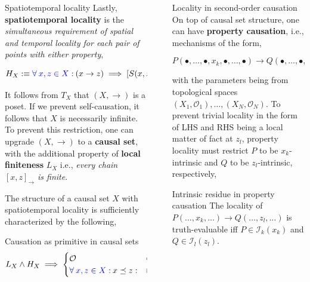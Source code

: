 \documentclass[final]{beamer}
\newenvironment{highlight}
{\begin{tcolorbox}[colback=lightblue, boxrule=0pt, frame empty]}
{\end{tcolorbox}}
\newlength{\sepwidth}
\newlength{\colwidth}
\newcommand{\separatorcolumn}{\begin{column}{\sepwidth}\end{column}}
\newcommand{\fa}{\forall \:}
\newcommand{\mc}{\mathcal}
\theoremstyle{remark}
\begin{document}
\begin{frame}[t]
\begin{columns}[t]
\begin{column}{\colwidth}
\begin{block}{Spatiotemporal locality}
Lastly, \textbf{spatiotemporal locality} is the \emph{simultaneous requirement of spatial and temporal locality for each pair of points with either property},

\begin{highlight}
$$H_X : \equiv \qua{\fa x, z \in X :} (x \to z) \implies \s{S(x, z) \iff T(x, z)}$$
\end{highlight}

It follows from $T_X$ that $(X, \to)$ is a poset. If we prevent self-causation, it follows that $X$ is necessarily infinite. To prevent this restriction, one can upgrade $(X, \to)$ to a \textbf{causal set}, with the additional property of \textbf{local finiteness} $L_X$ i.e., \emph{every chain $[x, z]_{\to}$ is finite}.

The structure of a causal set $X$ with spatiotemporal locality is sufficiently characterized by the following,

\begin{alertblock}{Causation as primitive in causal sets}
$$L_X \land H_X \implies \begin{cases}
\mc{O} & = \set{[x, z]_{\to}}{x, z \in X} \\
\qua{\fa x, z \in X :} x \preceq z : & \equiv [x, z]_{\to} \neq \es 
\end{cases}$$
\end{alertblock}
\end{block}

\end{column}

\separatorcolumn

\begin{column}{\colwidth}

\begin{block}{Locality in second-order causation}
On top of causal set structure, one can have \textbf{property causation}, i.e., mechanisms of the form,

$$P(\bullet, \dots, \bullet, x_k, \bullet, \dots, \bullet) \to Q(\bullet, \dots, \bullet, z_l, \bullet, \dots, \bullet)$$

with the parameters being from topological spaces $(X_1, \mc{O}_1), \dots, (X_N, \mc{O}_N)$. To prevent trivial locality in the form of LHS and RHS being a local matter of fact at $z_l$, property locality must restrict $P$ to be $x_k$-intrinsic and $Q$ to be $z_l$-intrinsic, respectively,

\begin{alertblock}{Intrinsic residue in property causation}
The locality of $P(\dots, x_k, \dots) \to Q(\dots, z_l, \dots)$ is truth-evaluable iff $P \in \mc{I}_k(x_k)$ and $Q \in \mc{I}_l(z_l)$.
\end{alertblock}


\end{block}
\end{column}
\end{columns}
\end{frame}
\end{document}
